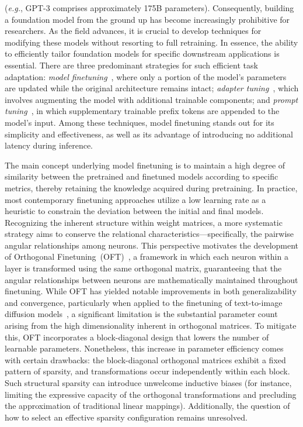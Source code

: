(\emph{e.g.}, GPT-3 comprises approximately 175B parameters). Consequently, building a foundation model from the ground up has become increasingly prohibitive for researchers. As the field advances, it is crucial to develop techniques for modifying these models without resorting to full retraining. In essence, the ability to efficiently tailor foundation models for specific downstream applications is essential. There are three predominant strategies for such efficient task adaptation: \emph{model finetuning}~\cite{hulora2022,zaken2022bitfit,guo2020parameter,raffel2020exploring,qiu2023controlling,zhang2022adaptive,chavan2023one}, where only a portion of the model’s parameters are updated while the original architecture remains intact; \emph{adapter tuning}~\cite{rebuffi2017learning,houlsby2019parameter,pfeiffer2020adapterfusion,lin2020exploring,he2021towards}, which involves augmenting the model with additional trainable components; and \emph{prompt tuning}~\cite{li2021prefix,lester2021power}, in which supplementary trainable prefix tokens are appended to the model’s input. Among these techniques, model finetuning stands out for its simplicity and effectiveness, as well as its advantage of introducing no additional latency during inference.

The main concept underlying model finetuning is to maintain a high degree of similarity between the pretrained and finetuned models according to specific metrics, thereby retaining the knowledge acquired during pretraining. In practice, most contemporary finetuning approaches utilize a low learning rate as a heuristic to constrain the deviation between the initial and final models. Recognizing the inherent structure within weight matrices, a more systematic strategy aims to conserve the relational characteristics—specifically, the pairwise angular relationships among neurons. This perspective motivates the development of Orthogonal Finetuning~(OFT)~\cite{qiu2023controlling}, a framework in which each neuron within a layer is transformed using the same orthogonal matrix, guaranteeing that the angular relationships between neurons are mathematically maintained throughout finetuning. While OFT has yielded notable improvements in both generalizability and convergence, particularly when applied to the finetuning of text-to-image diffusion models~\cite{qiu2023controlling}, a significant limitation is the substantial parameter count arising from the high dimensionality inherent in orthogonal matrices. To mitigate this, OFT incorporates a block-diagonal design that lowers the number of learnable parameters. Nonetheless, this increase in parameter efficiency comes with certain drawbacks: the block-diagonal orthogonal matrices exhibit a fixed pattern of sparsity, and transformations occur independently within each block. Such structural sparsity can introduce unwelcome inductive biases (for instance, limiting the expressive capacity of the orthogonal transformations and precluding the approximation of traditional linear mappings). Additionally, the question of how to select an effective sparsity configuration remains unresolved.

